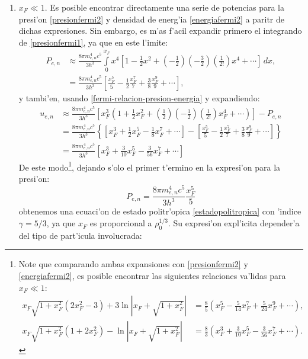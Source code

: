 \begin{enumerate}
 \item $x_F\ll1$. Es posible encontrar directamente una serie de potencias para la presi'on \eqref{presionfermi2} y densidad de energ'ia \eqref{energiafermi2} a paritr de dichas expresiones. Sin embargo, es m'as f'acil expandir primero el integrando de \eqref{presionfermi1}, ya que en este l'imite:
\begin{align}
P_{e,n}&\approx\frac{8\pi m_{e,n}^4c^5}{3h^3}\int\limits_0^{x_F}x^4\left[1-\frac{1}{2}x^2+\left(-\frac{1}{2}\right)\left(-\frac{3}{2}\right)\left(\frac{1}{2!}\right)x^4+\cdots\right]\,dx,\\
&=\frac{8\pi m_{e,n}^4c^5}{3h^3}\left[\frac{x_F^5}{5}-\frac{1}{2}\frac{x_F^7}{7}+\frac{3}{8}\frac{x_F^9}{9}+\cdots\right],
\end{align}
y tambi'en, usando \eqref{fermi-relacion-presion-energia} y expandiendo:
\begin{align}
 u_{e,n}&\approx\frac{8\pi m_{e,n}^4c^5}{3h^3}\left[x_F^3\left(1+\frac{1}{2}x_F^2+\left(\frac{1}{2}\right)\left(-\frac{1}{2}\right)\left(\frac{1}{2!}\right)x_F^4+\cdots\right)\right]-P_{e,n}\\
&=\frac{8\pi m_{e,n}^4c^5}{3h^3}\left\{\left[x_F^3+\frac{1}{2}x_F^5-\frac{1}{8}x_F^7+\cdots\right]-\left[\frac{x_F^5}{5}-\frac{1}{2}\frac{x_F^7}{7}+\frac{3}{8}\frac{x_F^9}{9}+\cdots\right]\right\}\\
&=\frac{8\pi m_{e,n}^4c^5}{3h^3}\left[x_F^3+\frac{3}{10}x_F^5-\frac{3}{56}x_F^7+\cdots \right]
\end{align}
De este modo\footnote{Note que comparando ambas expansiones con \eqref{presionfermi2} y \eqref{energiafermi2}, es posible encontrar las siguientes relaciones va'lidas para $x_F\ll1$:
\begin{align}
 x_F\sqrt{1+x_F^2}\left(2x_F^2-3\right)+3\ln\left|x_F+\sqrt{1+x_F^2}\right|&=\frac{8}{5}\left(x_F^5-\frac{5}{14}x_F^7+\frac{5}{24}x_F^9+\cdots\right),\\
 x_F\sqrt{1+x_F^2}\left(1+2x_F^2\right)-\ln\left|x_F+\sqrt{1+x_F^2}\right|&=\frac{8}{3}\left(x_F^3+\frac{3}{10}x_F^5-\frac{3}{56}x_F^7+\cdots \right).
\end{align}
}, dejando s'olo el primer t'ermino en la expresi'on para la presi'on:
\begin{equation}\label{presionfermi1-asintotico}
P_{e,n}=\frac{8\pi m_{e,n}^4c^5}{3h^3}\frac{x_F^5}{5}
\end{equation}
obtenemos una ecuaci'on de estado politr'opica \eqref{estadopolitropica} con 'indice $\gamma=5/3$, ya que $x_F$ es proporcional a $\rho_0^{1/3}$. Su expresi'on expl'icita depender'a del tipo de part'icula involucrada:

\end{enumerate}
